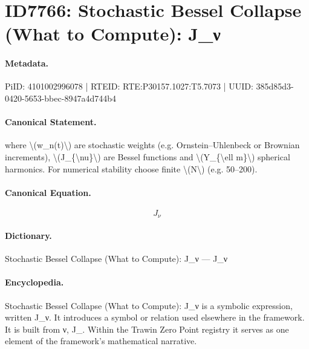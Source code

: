\section*{ID7766: Stochastic Bessel Collapse (What to Compute): J\_ν}
\paragraph{Metadata.}
PiID: 4101002996078 | RTEID: RTE:P30157.1027:T5.7073 | UUID: 385d85d3-0420-5653-bbec-8947a4d744b4

\paragraph{Canonical Statement.}
where \textbackslash{}(w\_n(t)\textbackslash{}) are stochastic weights (e.g. Ornstein–Uhlenbeck or Brownian increments), \textbackslash{}(J\_\{\textbackslash{}nu\}\textbackslash{}) are Bessel functions and \textbackslash{}(Y\_\{\textbackslash{}ell m\}\textbackslash{}) spherical harmonics. For numerical stability choose finite \textbackslash{}(N\textbackslash{}) (e.g. 50–200).

\paragraph{Canonical Equation.}
\[
J_{\nu}
\]

\paragraph{Dictionary.}
Stochastic Bessel Collapse (What to Compute): J\_ν — J\_ν

\paragraph{Encyclopedia.}
Stochastic Bessel Collapse (What to Compute): J\_ν is a symbolic expression, written J\_ν. It introduces a symbol or relation used elsewhere in the framework. It is built from ν, J\_. Within the Trawin Zero Point registry it serves as one element of the framework's mathematical narrative.
